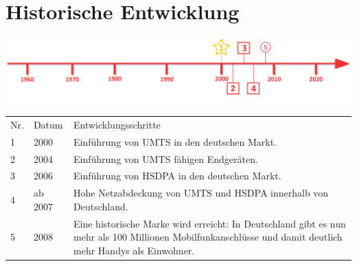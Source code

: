 \newpage
\section*{Historische Entwicklung}
\includegraphics[width=\textwidth]{Kapitel/3G/Grafiken/Zeitstrahl.png}
\par
\noindent
{}
\begin{tabular}{p{0.5 cm}p{1.5 cm}p{15.55 cm}}
	Nr. & Datum & Entwicklungsschritte\\
	1 & 2000 & Einführung von UMTS in den deutschen Markt.\\
	2 & 2004 & Einführung von UMTS fähigen Endgeräten.\\
	3 & 2006 & Einführung von HSDPA in den deutschen Markt.\\
	4 & ab 2007  & Hohe Netzabdeckung von UMTS und HSDPA innerhalb von Deutschland.\\
	5 & 2008 & Eine historische Marke wird erreicht: In Deutschland gibt es nun mehr als 100 Millionen Mobilfunkanschlüsse und damit deutlich mehr Handys als Einwohner.
\end{tabular}
\par
